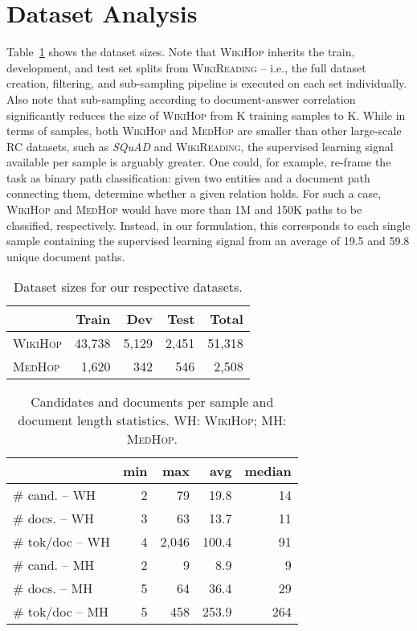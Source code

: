 \documentclass[11pt,letterpaper]{article}
\newcommand{\MedHop}{\textsc{MedHop}\xspace}
\newcommand{\WikiHop}{\textsc{WikiHop}\xspace}
\newcommand{\WikiReading}{\textsc{WikiReading}\xspace}
\begin{document}
\section{Dataset Analysis}
Table~\ref{tbl:dataset_sizes} shows the dataset sizes.
Note that \WikiHop inherits the train, development, and test set splits from {\WikiReading} -- i.e., the full dataset creation, filtering, and sub-sampling pipeline is executed on each set individually.
Also note that sub-sampling according to document-answer correlation significantly reduces the size of \WikiHop from K training samples to K.
While in terms of samples, both \WikiHop and \MedHop are smaller than other large-scale RC datasets, such as \emph{SQuAD} and \WikiReading, the supervised learning signal available per sample is arguably greater.
One could, for example, re-frame the task as binary path classification: given two entities and a document path connecting them, determine whether a given relation holds.
For such a case, \WikiHop and \MedHop would have more than 1M and 150K paths to be classified, respectively. Instead, in our formulation, this corresponds to each single sample containing the supervised learning signal from an average of 19.5 and 59.8 unique document paths.



\begin{table}
    \centering
    \begin{tabular}{lrrrr}
                    & Train     & Dev   & Test  & Total     \\
        \toprule
        \WikiHop    & 43,738    & 5,129 & 2,451 & 51,318    \\
        \MedHop     &  1,620    &   342 &   546 &  2,508     \\
    \end{tabular}
    \caption{
        Dataset sizes for our respective datasets.
}
    \label{tbl:dataset_sizes}
\end{table}
\begin{table}
    \centering
    \begin{tabular}{lrrrr}
                            & min       & max   & avg   &  median       \\
        \toprule
        \# cand.  -- WH     & 2         & 79    & 19.8  & 14    \\
        \# docs.  -- WH     & 3         & 63    & 13.7  & 11    \\
        \# tok/doc -- WH & 4         & 2,046  & 100.4 & 91    \\
        \midrule
        \# cand.  -- MH     & 2         & 9     & 8.9   & 9      \\
        \# docs.  -- MH     & 5         & 64    & 36.4  & 29    \\
        \# tok/doc  -- MH   & 5         & 458    & 253.9  & 264    \\
    \end{tabular}
    \caption{
        Candidates and documents per sample and document length statistics. WH: \WikiHop; MH: \MedHop.
}
    \label{tbl:dataset_minmaxmean}
\end{table}
\end{document}
